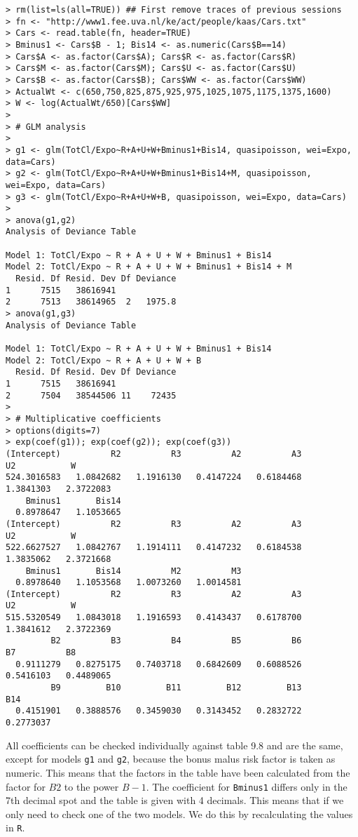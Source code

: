 \documentclass[11pt]{article}
\begin{document}
\begin{verbatim}
> rm(list=ls(all=TRUE)) ## First remove traces of previous sessions
> fn <- "http://www1.fee.uva.nl/ke/act/people/kaas/Cars.txt"
> Cars <- read.table(fn, header=TRUE)
> Bminus1 <- Cars$B - 1; Bis14 <- as.numeric(Cars$B==14)
> Cars$A <- as.factor(Cars$A); Cars$R <- as.factor(Cars$R)
> Cars$M <- as.factor(Cars$M); Cars$U <- as.factor(Cars$U)
> Cars$B <- as.factor(Cars$B); Cars$WW <- as.factor(Cars$WW)
> ActualWt <- c(650,750,825,875,925,975,1025,1075,1175,1375,1600)
> W <- log(ActualWt/650)[Cars$WW]
> 
> # GLM analysis
> 
> g1 <- glm(TotCl/Expo~R+A+U+W+Bminus1+Bis14, quasipoisson, wei=Expo, data=Cars)
> g2 <- glm(TotCl/Expo~R+A+U+W+Bminus1+Bis14+M, quasipoisson, wei=Expo, data=Cars)
> g3 <- glm(TotCl/Expo~R+A+U+W+B, quasipoisson, wei=Expo, data=Cars)
> 
> anova(g1,g2)
Analysis of Deviance Table

Model 1: TotCl/Expo ~ R + A + U + W + Bminus1 + Bis14
Model 2: TotCl/Expo ~ R + A + U + W + Bminus1 + Bis14 + M
  Resid. Df Resid. Dev Df Deviance
1      7515   38616941            
2      7513   38614965  2   1975.8
> anova(g1,g3)
Analysis of Deviance Table

Model 1: TotCl/Expo ~ R + A + U + W + Bminus1 + Bis14
Model 2: TotCl/Expo ~ R + A + U + W + B
  Resid. Df Resid. Dev Df Deviance
1      7515   38616941            
2      7504   38544506 11    72435
> 
> # Multiplicative coefficients
> options(digits=7)
> exp(coef(g1)); exp(coef(g2)); exp(coef(g3))
(Intercept)          R2          R3          A2          A3          U2           W
524.3016583   1.0842682   1.1916130   0.4147224   0.6184468   1.3841303   2.3722083
    Bminus1       Bis14 
  0.8978647   1.1053665 
(Intercept)          R2          R3          A2          A3          U2           W 
522.6627527   1.0842767   1.1914111   0.4147232   0.6184538   1.3835062   2.3721668 
    Bminus1       Bis14          M2          M3 
  0.8978640   1.1053568   1.0073260   1.0014581   
(Intercept)          R2          R3          A2          A3          U2           W 
515.5320549   1.0843018   1.1916593   0.4143437   0.6178700   1.3841612   2.3722369
         B2          B3          B4          B5          B6          B7          B8 
  0.9111279   0.8275175   0.7403718   0.6842609   0.6088526   0.5416103   0.4489065 
         B9         B10         B11         B12         B13         B14 
  0.4151901   0.3888576   0.3459030   0.3143452   0.2832722   0.2773037 
\end{verbatim}

All coefficients can be checked individually against table 9.8 and are the same, except for models \verb|g1| and \verb|g2|, because the bonus malus risk factor is taken as numeric. This means that the factors in the table have been calculated from the factor for $B2$ to the power $B - 1$. The coefficient for \verb|Bminus1| differs only in the 7th decimal spot and the table is given with 4 decimals. This means that if we only need to check one of the two models. We do this by recalculating the values in \verb|R|.
\end{document}
